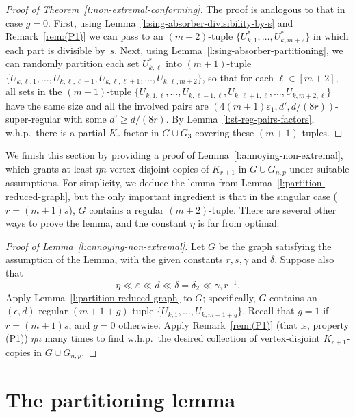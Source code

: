 \documentclass[reqno, 12pt]{amsart}
\numberwithin{equation}{section}
\numberwithin{figure}{section}
\theoremstyle{plain}
\theoremstyle{definition}
\let\eps=\varepsilon
\def \Gnp{G_{n,p}}
\begin{document}
\begin{proof}[Proof of Theorem~\ref{t:non-extremal-conforming}]
    The proof is analogous to that in case $g=0$. First, using Lemma~\ref{l:sing-absorber-divisibility-by-s} and Remark~\ref{rem:(P1)} we can pass to an $(m+2)$-tuple $\{U_{k,1}^*, \ldots, U_{k,m+2}^*\}$ in which each part is divisible by~$s$. Next, using Lemma~\ref{l:sing-absorber-partitioning}, we can randomly partition each set $U_{k,\ell}^*$ into $(m+1)$-tuple $\{U_{k,\ell,1},\dots,U_{k,\ell,\ell-1},U_{k,\ell,\ell+1},\dots,U_{k,\ell,m+2}\}$, so that for each $\ell\in[m+2]$, all sets in the $(m+1)$-tuple $\{U_{k,1,\ell},\dots,U_{k,\ell-1,\ell},U_{k,\ell+1,\ell},\dots,U_{k,m+2,\ell}\}$ have the same size and all the involved pairs are $(4(m+1)\eps_1,d',d/(8r))$-super-regular with some $d'\geq d/(8r)$. By Lemma~\ref{l:st-reg-pairs-factors}, w.h.p.~there is a partial $K_r$-factor in $G\cup G_3$ covering these $(m+1)$-tuples. 
    \end{proof}

    We finish this section by providing a proof of Lemma~\ref{l:annoying-non-extremal}, which grants at least $\eta n$ vertex-disjoint copies of $K_{r+1}$ in $G \cup \Gnp$ under suitable assumptions. For simplicity, we deduce the lemma from Lemma~\ref{l:partition-reduced-graph}, but the only important ingredient is that in the singular case ($r = (m+1)s$), $G$ contains a regular $(m+2)$-tuple. There are several other ways to prove the lemma, and the constant $\eta$ is far from optimal.


    \begin{proof}[Proof of Lemma~\ref{l:annoying-non-extremal}]
    Let $G$ be the graph satisfying the assumption of the Lemma, with the given constants $r, s, \gamma$ and $\delta$. Suppose also that 
         $$\eta \ll \eps \ll d \ll \delta =\delta_2 \ll \gamma, r^{-1}.$$ 
        Apply Lemma~\ref{l:partition-reduced-graph} to $G$; specifically, $G$ contains an $(\epsilon, d)$-regular $(m+1+g)$-tuple $\{U_{k,1},\dots,U_{k,m+1+g}\}$. Recall that $g=1$ if $r = (m+1)s$, and $g=0$ otherwise. Apply Remark~\ref{rem:(P1)} (that is, property (P1)) $\eta n$ many times to find w.h.p.~the desired collection of vertex-disjoint $K_{r+1}$-copies in $G\cup \Gnp$.
    \end{proof}
    
    
    \section{The partitioning lemma}
	   \label{sec:partition-lemma} 
    
\end{document}
